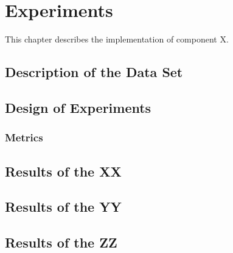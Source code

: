 \chapter{Experiments\label{cha:chapter6}}
This chapter describes the implementation of component X.

\section{Description of the Data Set\label{sec:xx}}

\section{Design of Experiments\label{sec:yy}}

\subsection{Metrics}

\section{Results of the XX\label{sec:ch6xx}}

\section{Results of the YY\label{sec:ch6yy}}

\section{Results of the ZZ\label{sec:ch6zz}}